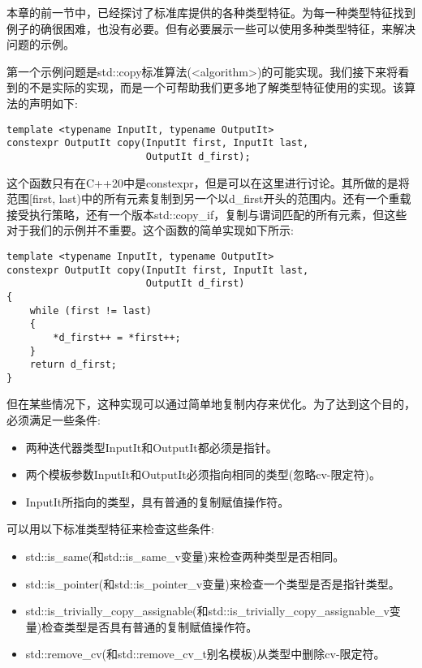 
本章的前一节中，已经探讨了标准库提供的各种类型特征。为每一种类型特征找到例子的确很困难，也没有必要。但有必要展示一些可以使用多种类型特征，来解决问题的示例。


第一个示例问题是std::copy标准算法(<algorithm>)的可能实现。我们接下来将看到的不是实际的实现，而是一个可帮助我们更多地了解类型特征使用的实现。该算法的声明如下:

\begin{lstlisting}[style=styleCXX]
template <typename InputIt, typename OutputIt>
constexpr OutputIt copy(InputIt first, InputIt last,
						OutputIt d_first);
\end{lstlisting}

这个函数只有在C++20中是constexpr，但是可以在这里进行讨论。其所做的是将范围[first, last)中的所有元素复制到另一个以d\_first开头的范围内。还有一个重载接受执行策略，还有一个版本std::copy\_if，复制与谓词匹配的所有元素，但这些对于我们的示例并不重要。这个函数的简单实现如下所示:

\begin{lstlisting}[style=styleCXX]
template <typename InputIt, typename OutputIt>
constexpr OutputIt copy(InputIt first, InputIt last,
						OutputIt d_first)
{
	while (first != last)
	{
		*d_first++ = *first++;
	}
	return d_first;
}
\end{lstlisting}

但在某些情况下，这种实现可以通过简单地复制内存来优化。为了达到这个目的，必须满足一些条件:

\begin{itemize}
\item
两种迭代器类型InputIt和OutputIt都必须是指针。

\item
两个模板参数InputIt和OutputIt必须指向相同的类型(忽略cv-限定符)。

\item
InputIt所指向的类型，具有普通的复制赋值操作符。
\end{itemize}

可以用以下标准类型特征来检查这些条件:

\begin{itemize}
\item
std::is\_same(和std::is\_same\_v变量)来检查两种类型是否相同。

\item
std::is\_pointer(和std::is\_pointer\_v变量)来检查一个类型是否是指针类型。

\item
std::is\_trivially\_copy\_assignable(和std::is\_trivially\_copy\_assignable\_v变量)检查类型是否具有普通的复制赋值操作符。

\item
std::remove\_cv(和std::remove\_cv\_t别名模板)从类型中删除cv-限定符。
\end{itemize}

